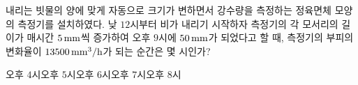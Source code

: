 내리는 빗물의 양에 맞게 자동으로 크기가 변하면서 강수량을 측정하는 정육면체 모양의 측정기를 설치하였다. 낮 $12$시부터 비가 내리기 시작하자 측정기의 각 모서리의 길이가 매시간 $5\mkern3mu \mathrm{mm}$씩 증가하여 오후 $9$시에 $50\mkern3mu \mathrm{mm}$가 되었다고 할 때, 측정기의 부피의 변화율이 $13500\mkern3mu \mathrm{mm}^3/\mathrm{h}$가 되는 순간은 몇 시인가?
\begin{choices32}{오후 $4$시}{오후 $5$시}{오후 $6$시}{오후 $7$시}{오후 $8$시}\end{choices32}
